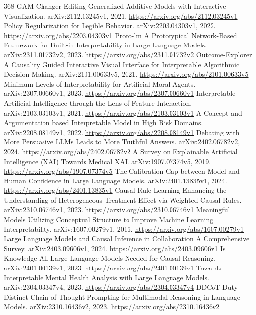 \documentclass[11pt]{article}
\begin{document}
\begin{thebibliography}{368}
 GAM Changer Editing Generalized Additive Models with Interactive Visualization. arXiv:2112.03245v1, 2021. \url{https://arxiv.org/abs/2112.03245v1}
 Policy Regularization for Legible Behavior. arXiv:2203.04303v1, 2022. \url{https://arxiv.org/abs/2203.04303v1}
 Proto-lm A Prototypical Network-Based Framework for Built-in Interpretability in Large Language Models. arXiv:2311.01732v2, 2023. \url{https://arxiv.org/abs/2311.01732v2}
 Outcome-Explorer A Causality Guided Interactive Visual Interface for Interpretable Algorithmic Decision Making. arXiv:2101.00633v5, 2021. \url{https://arxiv.org/abs/2101.00633v5}
 Minimum Levels of Interpretability for Artificial Moral Agents. arXiv:2307.00660v1, 2023. \url{https://arxiv.org/abs/2307.00660v1}
 Interpretable Artificial Intelligence through the Lens of Feature Interaction. arXiv:2103.03103v1, 2021. \url{https://arxiv.org/abs/2103.03103v1}
 A Concept and Argumentation based Interpretable Model in High Risk Domains. arXiv:2208.08149v1, 2022. \url{https://arxiv.org/abs/2208.08149v1}
 Debating with More Persuasive LLMs Leads to More Truthful Answers. arXiv:2402.06782v2, 2024. \url{https://arxiv.org/abs/2402.06782v2}
 A Survey on Explainable Artificial Intelligence (XAI) Towards Medical XAI. arXiv:1907.07374v5, 2019. \url{https://arxiv.org/abs/1907.07374v5}
 The Calibration Gap between Model and Human Confidence in Large Language Models. arXiv:2401.13835v1, 2024. \url{https://arxiv.org/abs/2401.13835v1}
 Causal Rule Learning Enhancing the Understanding of Heterogeneous Treatment Effect via Weighted Causal Rules. arXiv:2310.06746v1, 2023. \url{https://arxiv.org/abs/2310.06746v1}
 Meaningful Models Utilizing Conceptual Structure to Improve Machine Learning Interpretability. arXiv:1607.00279v1, 2016. \url{https://arxiv.org/abs/1607.00279v1}
 Large Language Models and Causal Inference in Collaboration A Comprehensive Survey. arXiv:2403.09606v1, 2024. \url{https://arxiv.org/abs/2403.09606v1}
 Is Knowledge All Large Language Models Needed for Causal Reasoning. arXiv:2401.00139v1, 2023. \url{https://arxiv.org/abs/2401.00139v1}
 Towards Interpretable Mental Health Analysis with Large Language Models. arXiv:2304.03347v4, 2023. \url{https://arxiv.org/abs/2304.03347v4}
 DDCoT Duty-Distinct Chain-of-Thought Prompting for Multimodal Reasoning in Language Models. arXiv:2310.16436v2, 2023. \url{https://arxiv.org/abs/2310.16436v2}

\end{thebibliography}
\end{document}
